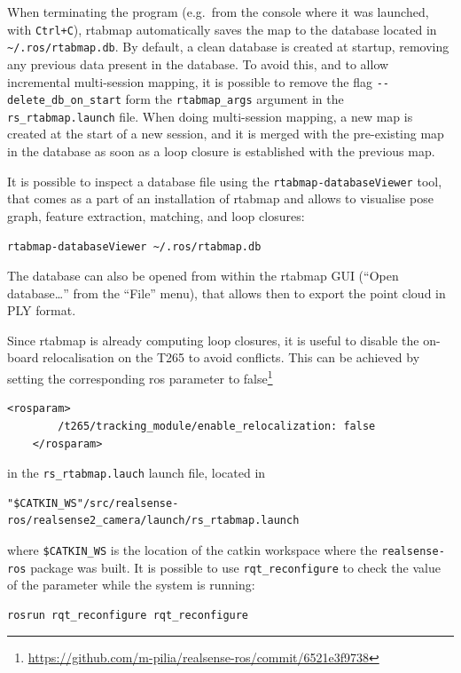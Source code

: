 \documentclass[11pt, letterpaper, twoside]{article}
\begin{document}
When terminating the program (e.g.\ from the console where it was launched, with
\texttt{Ctrl+C}), \gls{rtabmap} automatically saves the map to the database
located in \texttt{\textasciitilde/.ros/rtabmap.db}. By default, a clean database is created
at startup, removing any previous data present in the database. To avoid this,
and to allow incremental multi-session mapping, it is possible to remove the
flag \texttt{-{}-delete\_db\_on\_start} form the \texttt{rtabmap\_args} argument
in the \texttt{rs\_rtabmap.launch} file. When doing multi-session mapping, a
new map is created at the start of a new session, and it is merged with
the pre-existing map in the database as soon as a loop closure is established
with the previous map.

It is possible to inspect a database file using the
\texttt{rtabmap-databaseViewer} tool, that comes as a part of an installation
of \gls{rtabmap} and allows to visualise pose graph, feature extraction,
matching, and loop closures:
\begin{Verbatim}[samepage=true]
    rtabmap-databaseViewer ~/.ros/rtabmap.db
\end{Verbatim}
The database can also be opened from within the \gls{rtabmap} GUI (``Open
database\ldots'' from the ``File'' menu), that allows then to export the point
cloud in PLY format.

Since \gls{rtabmap} is already computing loop closures, it is useful to disable
the on-board relocalisation on the T265 to avoid conflicts. This can be
achieved by setting the corresponding \gls{ros} parameter to
false\footnote{\url{https://github.com/m-pilia/realsense-ros/commit/6521e3f9738}}
\begin{Verbatim}[samepage=true]
    <rosparam>
        /t265/tracking_module/enable_relocalization: false
    </rosparam>
\end{Verbatim}
in the \texttt{rs\_rtabmap.lauch} launch file, located in
\begin{Verbatim}[samepage=true]
    "$CATKIN_WS"/src/realsense-ros/realsense2_camera/launch/rs_rtabmap.launch
\end{Verbatim}
where \texttt{\$CATKIN\_WS} is the location of the catkin workspace where the
\texttt{realsense-ros} package was built. It is possible to use
\texttt{rqt\_reconfigure} to check the value of the parameter while the system
is running:
\begin{Verbatim}[samepage=true]
    rosrun rqt_reconfigure rqt_reconfigure
\end{Verbatim}
\end{document}
